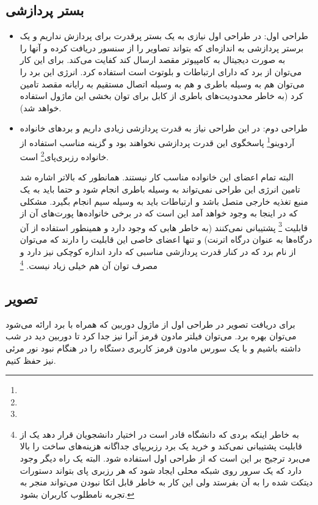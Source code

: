 \documentclass{article}
\begin{document}
\subsection{بستر پردازشی}
\begin{itemize}
	\item طراحی اول: در طراحی اول نیازی به یک بستر پرقدرت برای پردازش نداریم
	و یک برستر پردازشی به اندازه‌ای که بتواند تصاویر را از سنسور دریافت کرده و آنها را به صورت دیجیتال به کامپیوتر مقصد ارسال کند کفایت می‌کند. برای این کار می‌توان از برد  که دارای ارتباطات  و بلوتوث است استفاده کرد. انرژی این برد را می‌توان هم به وسیله باطری و هم به وسیله اتصال  مستقیم به رایانه مقصد تامین کرد (به خاطر محدودیت‌های باطری‌ از کابل برای توان بخشی این ماژول استفاده خواهد شد).
	
	\item طراحی دوم: در این طراحی نیاز به قدرت پردازشی زیادی داریم و برد‌های خانواده آردوینو\footnote{} پاسخگوی این قدرت پردازشی نخواهند بود و گزینه مناسب استفاده از خانواده رزبری‌پای\footnote{} است.
	
	البته تمام اعضای این خانواده مناسب کار نیستند. همانطور که بالاتر اشاره شد تامین انرژی این طراحی نمی‌تواند به وسیله باطری انجام شود و حتما باید به یک منبع تغذیه خارجی متصل باشد و ارتباطات باید به وسیله سیم انجام بگیرد. مشکلی که در اینجا به وجود خواهد آمد این است که در برخی خانواده‌ها پورت‌های  آن از قابلیت \footnote{} پشتیبانی نمی‌کنند (به خاطر هابی که وجود دارد و همینطور استفاده از آن درگاه‌ها به عنوان درگاه اترنت) و تنها اعضای خاصی این قابلیت‌ را دارند که می‌توان از  نام برد که در کنار قدرت پردازشی مناسبی که دارد اندازه کوچکی نیز دارد و مصرف توان آن هم خیلی زیاد نیست.
	\footnote{به خاطر اینکه بردی که دانشگاه قادر است در اختیار دانشجویان قرار دهد یک از قابلیت  پشتیبانی نمی‌کند و خرید یک برد رزبریپای جداگانه هزینه‌های ساخت‌ را بالا می‌برد ترجیح بر این است که از طراحی اول استفاده شود. البته یک راه دیگر وجود دارد که یک سرور روی شبکه محلی ایجاد شود که هر رزبری پای بتواند دستورات دیتکت شده را به آن بفرستد ولی این کار به خاطر قابل اتکا نبودن می‌تواند منجر به تجربه نامطلوب کاربران بشود.}
\end{itemize}

\subsection{تصویر}
برای دریافت تصویر در طراحی اول از ماژول دوربین که همراه با برد  ارائه می‌شود می‌توان بهره برد. می‌توان فیلتر مادون قرمز آنرا نیز جدا کرد تا دوربین دید در شب داشته باشیم   و با یک سورس مادون قرمز کاربری دستگاه را در هنگام نبود نور مرئی نیز حفظ کنیم.
\end{document}
